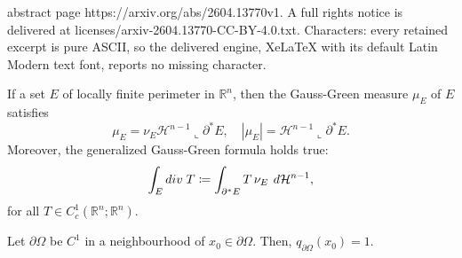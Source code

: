 \documentclass[10pt,a4paper]{amsart}
\newcommand{\Hd}{\mathcal{H}}
\newcommand{\R}{\mathbb{R}}
\newcommand{\dd}{\: d}
\newcommand{\divv}{\textnormal{div} \;}
\newcommand{\pom}{{\partial \Omega}}
\begin{document}
abstract page https://arxiv.org/abs/2604.13770v1. A full rights notice is delivered at licenses/arxiv-2604.13770-CC-BY-4.0.txt. Characters: every retained excerpt is pure ASCII, so the delivered engine, XeLaTeX with its default Latin Modern text font, reports no missing character.
	\begin{theorem} \label{thm:Giorgo}
		If a set $E$ of locally finite perimeter in $\R^n$, then the Gauss-Green measure $\mu_E$ of $E$ satisfies
		\[
		\mu_E = \nu_E \Hd^{n-1} \llcorner \partial^\ast E, \quad |\mu_E| = \Hd^{n-1} \llcorner \partial^\ast E.
		\]
		Moreover, the generalized Gauss-Green formula holds true:
		\[
		\int_E \divv T \coloneqq \int_{\partial^\ast E} T \, \nu_E \, \dd \Hd^{n-1},
		\]
		for all $T \in C^1_c(\R^n;\R^n)$.
	\end{theorem}

	\begin{theorem} \label{thm:Giusti}
		Let $\pom$ be $C^1$ in a neighbourhood of $x_0 \in \pom$. Then, $q_{\pom}(x_0) = 1$.
	\end{theorem}
\end{document}

